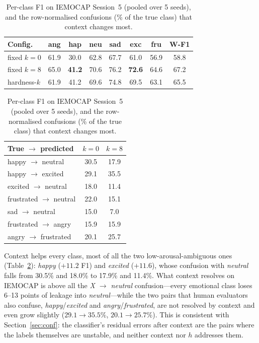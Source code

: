 \documentclass[journal]{IEEEtran}
\newcommand{\wf}{W-F1}
\begin{document}
\begin{table}[t]\centering\small
\caption{Per-class F1 on IEMOCAP Session~5 (pooled over 5 seeds), and the row-normalised confusions (\% of the true class) that context changes most.}\label{tab:perclass}
\begin{tabular}{lccccccc}\toprule
Config. & ang & hap & neu & sad & exc & fru & \wf \\ \midrule
fixed $k=0$ & 61.9 & 30.0 & 62.8 & 67.7 & 61.0 & 56.9 & 58.8 \\
fixed $k=8$ & 65.0 & \textbf{41.2} & 70.6 & 76.2 & \textbf{72.6} & 64.6 & 67.2 \\
hardness-$k$ & 61.9 & 41.2 & 69.6 & 74.8 & 69.5 & 63.1 & 65.5 \\ \bottomrule
\end{tabular}
\vspace{4pt}
\begin{tabular}{lcc}\toprule
True $\rightarrow$ predicted & $k=0$ & $k=8$ \\ \midrule
happy $\rightarrow$ neutral & 30.5 & 17.9 \\
happy $\rightarrow$ excited & 29.1 & 35.5 \\
excited $\rightarrow$ neutral & 18.0 & 11.4 \\
frustrated $\rightarrow$ neutral & 22.0 & 15.1 \\
sad $\rightarrow$ neutral & 15.0 & 7.0 \\
frustrated $\rightarrow$ angry & 15.9 & 15.9 \\
angry $\rightarrow$ frustrated & 20.1 & 25.7 \\ \bottomrule
\end{tabular}
\end{table}

Context helps every class, most of all the two low-arousal-ambiguous ones (Table~\ref{tab:perclass}): \emph{happy} ($+11.2$ F1) and \emph{excited} ($+11.6$), whose confusion with \emph{neutral} falls from 30.5\% and 18.0\% to 17.9\% and 11.4\%. What context resolves on IEMOCAP is above all the \emph{X $\rightarrow$ neutral} confusion---every emotional class loses 6--13 points of leakage into \emph{neutral}---while the two pairs that human evaluators also confuse, \emph{happy}/\emph{excited} and \emph{angry}/\emph{frustrated}, are not resolved by context and even grow slightly ($29.1 \rightarrow 35.5\%$, $20.1 \rightarrow 25.7\%$). This is consistent with Section~\ref{sec:conf}: the classifier's residual errors after context are the pairs where the labels themselves are unstable, and neither context nor $h$ addresses them.
\end{document}
